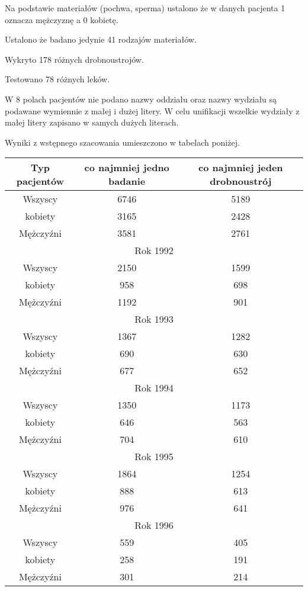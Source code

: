 \documentclass[a4paper,11pt]{article}
\begin{document}
Na podstawie materiałów (pochwa, sperma) ustalono że w danych pacjenta 1 oznacza mężczyznę a 0 kobietę.

Ustalono że badano jedynie 41 rodzajów materiałów.

Wykryto 178 różnych drobnoustrojów.

Testowano 78 różnych leków.

W 8 polach pacjentów nie podano nazwy oddziału oraz nazwy wydziału są podawane wymiennie z małej i dużej litery.
W celu unifikacji wszelkie wydziały z małej litery zapisano w samych dużych literach.

Wyniki z wstępnego szacowania umieszczono w tabelach poniżej.

\begin{table}[h]
\begin{center}
\begin{tabular}{|c|c|c|}
\hline
Typ pacjentów &  co najmniej jedno badanie  & co najmniej jeden drobnoustrój \\
\hline
Wszyscy & 6746 &5189\\
kobiety  & 3165  & 2428\\
Mężczyźni & 3581 & 2761\\ \hline
\multicolumn{3}{|c|}{Rok 1992} \\ \hline
Wszyscy & 2150 &1599\\
kobiety  & 958  & 698\\
Mężczyźni & 1192 & 901\\ \hline
\multicolumn{3}{|c|}{Rok 1993} \\ \hline
Wszyscy & 1367 &1282\\
kobiety  & 690  & 630\\
Mężczyźni & 677 & 652\\ \hline
\multicolumn{3}{|c|}{Rok 1994} \\ \hline
Wszyscy & 1350 &1173\\
kobiety  & 646  & 563\\
Mężczyźni & 704 & 610\\ \hline
\multicolumn{3}{|c|}{Rok 1995} \\ \hline
Wszyscy & 1864 &1254\\
kobiety  & 888  & 613\\
Mężczyźni & 976 & 641\\ \hline
\multicolumn{3}{|c|}{Rok 1996} \\ \hline
Wszyscy & 559 &405\\
kobiety  & 258  & 191\\
Mężczyźni & 301 & 214\\ \hline
\hline
\end{tabular}
\end{center}
\end{table}
\end{document}
